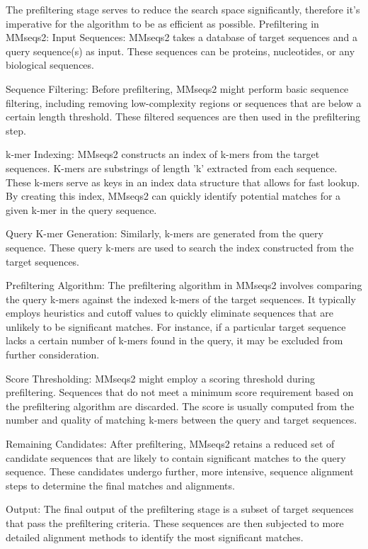 The prefiltering stage serves to reduce the search space significantly, therefore it's imperative for the algorithm to be as efficient as possible.
Prefiltering in MMseqs2:
Input Sequences:
MMseqs2 takes a database of target sequences and a query sequence(s) as input. These sequences can be proteins, nucleotides, or any biological sequences.

Sequence Filtering:
Before prefiltering, MMseqs2 might perform basic sequence filtering, including removing low-complexity regions or sequences that are below a certain length threshold. These filtered sequences are then used in the prefiltering step.

k-mer Indexing:
MMseqs2 constructs an index of k-mers from the target sequences. K-mers are substrings of length 'k' extracted from each sequence. These k-mers serve as keys in an index data structure that allows for fast lookup. By creating this index, MMseqs2 can quickly identify potential matches for a given k-mer in the query sequence.

Query K-mer Generation:
Similarly, k-mers are generated from the query sequence. These query k-mers are used to search the index constructed from the target sequences.

Prefiltering Algorithm:
The prefiltering algorithm in MMseqs2 involves comparing the query k-mers against the indexed k-mers of the target sequences. It typically employs heuristics and cutoff values to quickly eliminate sequences that are unlikely to be significant matches. For instance, if a particular target sequence lacks a certain number of k-mers found in the query, it may be excluded from further consideration.

Score Thresholding:
MMseqs2 might employ a scoring threshold during prefiltering. Sequences that do not meet a minimum score requirement based on the prefiltering algorithm are discarded. The score is usually computed from the number and quality of matching k-mers between the query and target sequences.

Remaining Candidates:
After prefiltering, MMseqs2 retains a reduced set of candidate sequences that are likely to contain significant matches to the query sequence. These candidates undergo further, more intensive, sequence alignment steps to determine the final matches and alignments.

Output:
The final output of the prefiltering stage is a subset of target sequences that pass the prefiltering criteria. These sequences are then subjected to more detailed alignment methods to identify the most significant matches.

